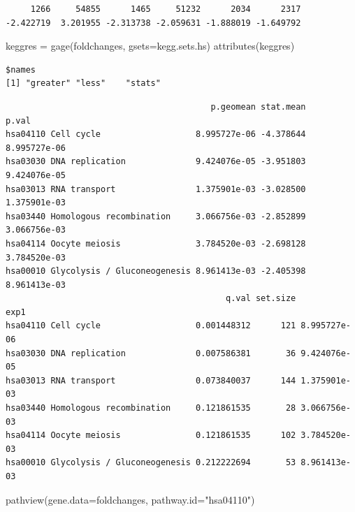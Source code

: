 \documentclass[
  letterpaper,
  DIV=11,
  numbers=noendperiod]{scrartcl}
\newenvironment{Shaded}{\begin{snugshade}}{\end{snugshade}}
\newcommand{\AttributeTok}[1]{\textcolor[rgb]{0.40,0.45,0.13}{#1}}
\newcommand{\FunctionTok}[1]{\textcolor[rgb]{0.28,0.35,0.67}{#1}}
\newcommand{\NormalTok}[1]{\textcolor[rgb]{0.00,0.23,0.31}{#1}}
\newcommand{\OtherTok}[1]{\textcolor[rgb]{0.00,0.23,0.31}{#1}}
\newcommand{\SpecialCharTok}[1]{\textcolor[rgb]{0.37,0.37,0.37}{#1}}
\newcommand{\StringTok}[1]{\textcolor[rgb]{0.13,0.47,0.30}{#1}}
\begin{document}
\begin{verbatim}
     1266     54855      1465     51232      2034      2317 
-2.422719  3.201955 -2.313738 -2.059631 -1.888019 -1.649792 
\end{verbatim}

\begin{Shaded}
\begin{Highlighting}[]
\NormalTok{keggres }\OtherTok{=} \FunctionTok{gage}\NormalTok{(foldchanges, }\AttributeTok{gsets=}\NormalTok{kegg.sets.hs)}
\FunctionTok{attributes}\NormalTok{(keggres)}
\end{Highlighting}
\end{Shaded}

\begin{verbatim}
$names
[1] "greater" "less"    "stats"  
\end{verbatim}

\begin{Shaded}
\end{Shaded}

\begin{verbatim}
                                         p.geomean stat.mean        p.val
hsa04110 Cell cycle                   8.995727e-06 -4.378644 8.995727e-06
hsa03030 DNA replication              9.424076e-05 -3.951803 9.424076e-05
hsa03013 RNA transport                1.375901e-03 -3.028500 1.375901e-03
hsa03440 Homologous recombination     3.066756e-03 -2.852899 3.066756e-03
hsa04114 Oocyte meiosis               3.784520e-03 -2.698128 3.784520e-03
hsa00010 Glycolysis / Gluconeogenesis 8.961413e-03 -2.405398 8.961413e-03
                                            q.val set.size         exp1
hsa04110 Cell cycle                   0.001448312      121 8.995727e-06
hsa03030 DNA replication              0.007586381       36 9.424076e-05
hsa03013 RNA transport                0.073840037      144 1.375901e-03
hsa03440 Homologous recombination     0.121861535       28 3.066756e-03
hsa04114 Oocyte meiosis               0.121861535      102 3.784520e-03
hsa00010 Glycolysis / Gluconeogenesis 0.212222694       53 8.961413e-03
\end{verbatim}

\begin{Shaded}
\begin{Highlighting}[]
\FunctionTok{pathview}\NormalTok{(}\AttributeTok{gene.data=}\NormalTok{foldchanges, }\AttributeTok{pathway.id=}\StringTok{"hsa04110"}\NormalTok{)}
\end{Highlighting}
\end{Shaded}
\end{document}
